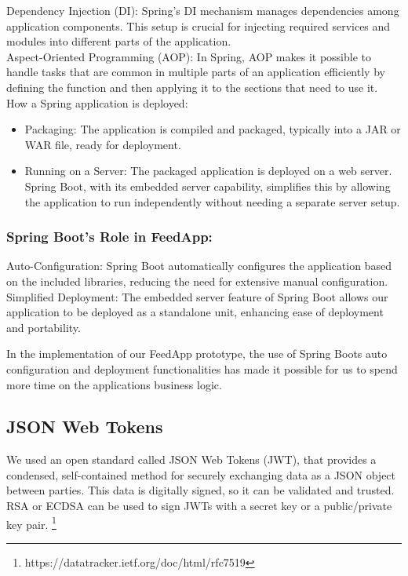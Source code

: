 \noindent Dependency Injection (DI): Spring's DI mechanism manages dependencies among application components. This setup is crucial for injecting required services and modules into different parts of the application. \\

\noindent Aspect-Oriented Programming (AOP): In Spring, AOP makes it possible to handle tasks that are common in multiple parts of an application efficiently by defining the function and then applying it to the sections that need to use it. \\


\noindent How a Spring application is deployed:

\begin{itemize}
    \item Packaging: The application is compiled and packaged, typically into a JAR or WAR file, ready for deployment.
    \item Running on a Server: The packaged application is deployed on a web server. Spring Boot, with its embedded server capability, simplifies this by allowing the application to run independently without needing a separate server setup.
\end{itemize}

\subsubsection{Spring Boot's Role in FeedApp:}

\noindent Auto-Configuration: Spring Boot automatically configures the application based on the included libraries, reducing the need for extensive manual configuration.\\

\noindent Simplified Deployment: The embedded server feature of Spring Boot allows our application to be deployed as a standalone unit, enhancing ease of deployment and portability.


\noindent In the implementation of our FeedApp prototype, the use of Spring Boots auto configuration and deployment functionalities has made it possible for us to spend more time on the applications business logic. 

\subsection{JSON Web Tokens}

\noindent We used an open standard called JSON Web Tokens (JWT), that provides a condensed, self-contained method for securely exchanging data as a JSON object between parties. This data is digitally signed, so it can be validated and trusted. RSA or ECDSA can be used to sign JWTs with a secret key or a public/private key pair. \footnote{https://datatracker.ietf.org/doc/html/rfc7519}\\

